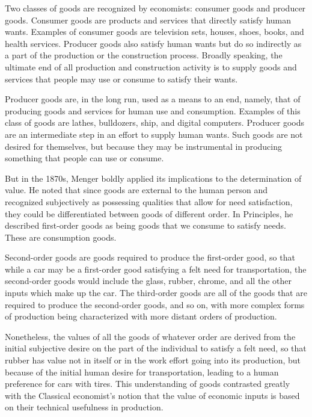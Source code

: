 Two classes of goods are recognized by economists: consumer goods and producer goods. Consumer goods are products and services that directly satisfy human wants. Examples of consumer goods are television sets, houses, shoes, books, and health services. Producer goods also satisfy human wants but do so indirectly as a part of the production or the construction process. Broadly speaking, the ultimate end of all production and construction activity is to supply goods and services that people may use or consume to satisfy their wants.

Producer goods are, in the long run, used as a means to an end, namely, that of producing goods and services for human use and consumption. Examples of this class of goods are lathes, bulldozers, ship, and digital computers. Producer goods are an intermediate step in an effort to supply human wants. Such goods are not desired for themselves, but because they may be instrumental in producing something that people can use or consume.

But in the 1870s, Menger boldly applied its implications to the determination of value. He noted that since goods are external to the human person and recognized subjectively as possessing qualities that allow for need satisfaction, they could be differentiated between goods of different order. In Principles, he described first-order goods as being goods that we consume to satisfy needs. These are consumption goods.

Second-order goods are goods required to produce the first-order good, so that while a car may be a first-order good satisfying a felt need for transportation, the second-order goods would include the glass, rubber, chrome, and all the other inputs which make up the car. The third-order goods are all of the goods that are required to produce the second-order goods, and so on, with more complex forms of production being characterized with more distant orders of production.

Nonetheless, the values of all the goods of whatever order are derived from the initial subjective desire on the part of the individual to satisfy a felt need, so that rubber has value not in itself or in the work effort going into its production, but because of the initial human desire for transportation, leading to a human preference for cars with tires. This understanding of goods contrasted greatly with the Classical economist’s notion that the value of economic inputs is based on their technical usefulness in production.
    
